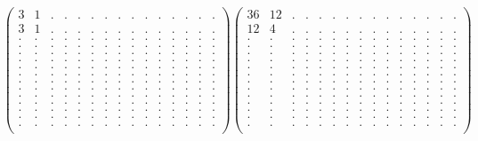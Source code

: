 \documentclass[12pt,a4paper]{amsart}
\begin{document}
\begin{align*}
\left(\begin{array}{rrrrrrrrrrrrrrr}%
3&1&.&.&.&.&.&.&.&.&.&.&.&.&.\\%
3&1&.&.&.&.&.&.&.&.&.&.&.&.&.\\%
.&.&.&.&.&.&.&.&.&.&.&.&.&.&.\\%
.&.&.&.&.&.&.&.&.&.&.&.&.&.&.\\%
.&.&.&.&.&.&.&.&.&.&.&.&.&.&.\\%
.&.&.&.&.&.&.&.&.&.&.&.&.&.&.\\%
.&.&.&.&.&.&.&.&.&.&.&.&.&.&.\\%
.&.&.&.&.&.&.&.&.&.&.&.&.&.&.\\%
.&.&.&.&.&.&.&.&.&.&.&.&.&.&.\\%
.&.&.&.&.&.&.&.&.&.&.&.&.&.&.\\%
.&.&.&.&.&.&.&.&.&.&.&.&.&.&.\\%
.&.&.&.&.&.&.&.&.&.&.&.&.&.&.\\%
.&.&.&.&.&.&.&.&.&.&.&.&.&.&.\\%
.&.&.&.&.&.&.&.&.&.&.&.&.&.&.\\%
.&.&.&.&.&.&.&.&.&.&.&.&.&.&.\\%
\end{array}\right)%
\left(\begin{array}{rrrrrrrrrrrrrrr}%
36&12&.&.&.&.&.&.&.&.&.&.&.&.&.\\%
12&4&.&.&.&.&.&.&.&.&.&.&.&.&.\\%
.&.&.&.&.&.&.&.&.&.&.&.&.&.&.\\%
.&.&.&.&.&.&.&.&.&.&.&.&.&.&.\\%
.&.&.&.&.&.&.&.&.&.&.&.&.&.&.\\%
.&.&.&.&.&.&.&.&.&.&.&.&.&.&.\\%
.&.&.&.&.&.&.&.&.&.&.&.&.&.&.\\%
.&.&.&.&.&.&.&.&.&.&.&.&.&.&.\\%
.&.&.&.&.&.&.&.&.&.&.&.&.&.&.\\%
.&.&.&.&.&.&.&.&.&.&.&.&.&.&.\\%
.&.&.&.&.&.&.&.&.&.&.&.&.&.&.\\%
.&.&.&.&.&.&.&.&.&.&.&.&.&.&.\\%
.&.&.&.&.&.&.&.&.&.&.&.&.&.&.\\%
.&.&.&.&.&.&.&.&.&.&.&.&.&.&.\\%
.&.&.&.&.&.&.&.&.&.&.&.&.&.&.\\%
\end{array}\right)%
\end{align*}
\end{document}
